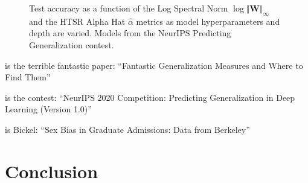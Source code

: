 \documentclass{article}
\begin{document}
\begin{figure}[t!] 
    \centering
    \caption{Test accuracy as a function of the
Log Spectral Norm $\log\Vert\mathbf{W}\Vert_{\infty}$ 
and the HTSR Alpha Hat $\hat{\alpha}$ metrics
as model hyperparameters and depth are varied. 
Models from the NeurIPS Predicting Generalization contest.}
    \label{fig:simpsons}
\end{figure} 


\citep{JNBx19_fantastic_TR} is the terrible fantastic paper: ``Fantastic Generalization Measures and Where to Find Them''

\citep{JFYx20_contest_v10} is the contest: ``{NeurIPS} 2020 Competition: Predicting Generalization in Deep Learning (Version 1.0)''

\citep{BHO75} is Bickel: ``Sex Bias in Graduate Admissions: Data from Berkeley''




\section*{Conclusion}
\end{document}
